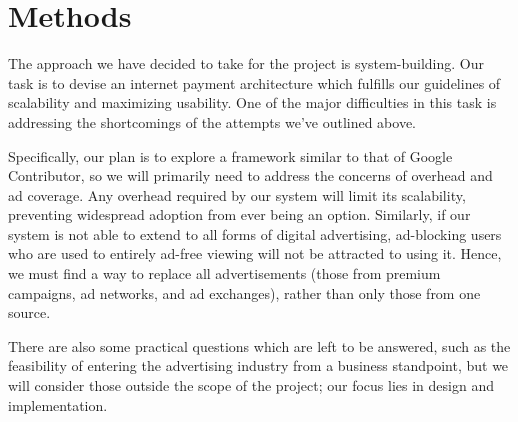 \section{Methods}
The approach we have decided to take for the project is system-building.
Our task is to devise an internet payment architecture which fulfills our guidelines of scalability and maximizing usability.
One of the major difficulties in this task is addressing the shortcomings of the attempts we've outlined above.

Specifically, our plan is to explore a framework similar to that of Google Contributor, so we will primarily need to address the concerns of overhead and ad coverage.
Any overhead required by our system will limit its scalability, preventing widespread adoption from ever being an option.
Similarly, if our system is not able to extend to all forms of digital advertising, ad-blocking users who are used to entirely ad-free viewing will not be attracted to using it.
Hence, we must find a way to replace all advertisements (those from premium campaigns, ad networks, and ad exchanges), rather than only those from one source.

There are also some practical questions which are left to be answered, such as the feasibility of entering the advertising industry from a business standpoint, but we will consider those outside the scope of the project; our focus lies in design and implementation.
